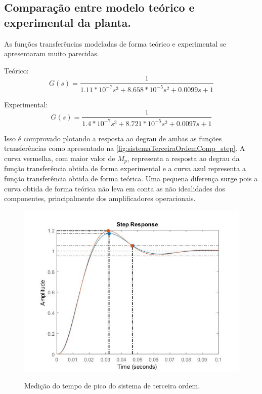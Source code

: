 \documentclass[
	article,			%
	11pt,				%
	oneside,			%
	a4paper,			%
	english,			%
	brazil,				%
	sumario=tradicional
	]{abntex2}
\begin{document}
\pagebreak

\subsection{Comparação entre modelo teórico e experimental da planta.}

As funções transferências modeladas de forma teórico e experimental se apresentaram muito parecidas.

Teórico:
$$
	G(s) = \frac{1}{1.11*10^{-7} s^3 + 8.658*10^{-5} s^2 + 0.0099 s + 1}
$$

Experimental:
$$
	G(s) = \frac{1}{1.4*10^{-7} s^3 + 8.721*10^{-5} s^2 + 0.0097 s + 1}
$$

Isso é comprovado plotando a resposta ao degrau de ambas as funções transferências como apresentado na \autoref{fig:sistemaTerceiraOrdemComp_step}.
A curva vermelha, com maior valor de $M_p$, representa a resposta ao degrau da função transferência obtida de forma experimental e a curva azul representa a função transferência obtida de forma teórica.
Uma pequena diferença surge pois a curva obtida de forma teórica não leva em conta as não idealidades dos componentes, principalmente dos amplificadores operacionais.
\begin{figure}[htb!]
	\centering
	\caption{Medição do tempo de pico do sistema de terceira ordem.}
	\includegraphics[scale=0.8]{./img/sistemaTerceiraOrdemComp_step.JPG}
	\label{fig:sistemaTerceiraOrdemComp_step}
\end{figure}

\pagebreak
\end{document}
